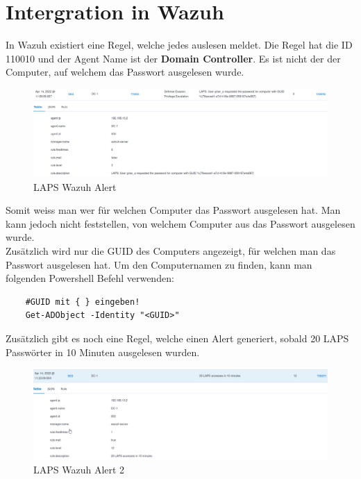 \section{Intergration in Wazuh}
In Wazuh existiert eine Regel, welche jedes auslesen meldet.
Die Regel hat die ID 110010 und der Agent Name ist der \textbf{Domain Controller}.
Es ist nicht der der Computer, auf welchem das Passwort ausgelesen wurde.
\begin{figure}[H]
    \centering
    \includegraphics[width=\linewidth]{../img/LAPS/laps-wazuh.png}
    \caption{LAPS Wazuh Alert}
\end{figure}
Somit weiss man wer für welchen Computer das Passwort ausgelesen hat.
Man kann jedoch nicht feststellen, von welchem Computer aus das Passwort ausgelesen wurde.\\

Zusätzlich wird nur die GUID des Computers angezeigt, für welchen man das Passwort ausgelesen hat.
Um den Computernamen zu finden, kann man folgenden Powershell Befehl verwenden:
\begin{lstlisting}
    #GUID mit { } eingeben!
    Get-ADObject -Identity "<GUID>"
\end{lstlisting}

Zusätzlich gibt es noch eine Regel, welche einen Alert generiert, sobald 20 LAPS Passwörter in 10 Minuten ausgelesen wurden.
\begin{figure}[H]
    \centering
    \includegraphics[width=\linewidth]{../img/LAPS/laps-wazuh-alert.png}
    \caption{LAPS Wazuh Alert 2}
\end{figure}